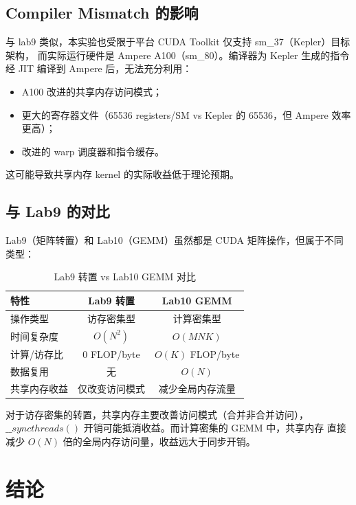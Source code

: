\documentclass[UTF8,a4paper,12pt,fontset=none]{ctexart}
\begin{document}
\subsection{Compiler Mismatch 的影响}

与 lab9 类似，本实验也受限于平台 CUDA Toolkit 仅支持 sm\_37（Kepler）目标架构，
而实际运行硬件是 Ampere A100（sm\_80）。编译器为 Kepler 生成的指令经 JIT 编译到
Ampere 后，无法充分利用：

\begin{itemize}
  \item A100 改进的共享内存访问模式；
  \item 更大的寄存器文件（65536 registers/SM vs Kepler 的 65536，但 Ampere 效率更高）；
  \item 改进的 warp 调度器和指令缓存。
\end{itemize}

这可能导致共享内存 kernel 的实际收益低于理论预期。

\subsection{与 Lab9 的对比}

Lab9（矩阵转置）和 Lab10（GEMM）虽然都是 CUDA 矩阵操作，但属于不同类型：

\begin{table}[H]
  \centering
  \caption{Lab9 转置 vs Lab10 GEMM 对比}
  \label{tab:comparison}
  \begin{tabular}{lcc}
    \toprule
    特性 & Lab9 转置 & Lab10 GEMM \\
    \midrule
    操作类型 & 访存密集型 & 计算密集型 \\
    时间复杂度 & $O(N^2)$ & $O(MNK)$ \\
    计算/访存比 & 0 FLOP/byte & $O(K)$ FLOP/byte \\
    数据复用 & 无 & $O(N)$ \\
    共享内存收益 & 仅改变访问模式 & 减少全局内存流量 \\
    \bottomrule
  \end{tabular}
\end{table}

对于访存密集的转置，共享内存主要改善访问模式（合并非合并访问），
$\_\_syncthreads()$ 开销可能抵消收益。而计算密集的 GEMM 中，共享内存
直接减少 $O(N)$ 倍的全局内存访问量，收益远大于同步开销。

\section{结论}
\end{document}
